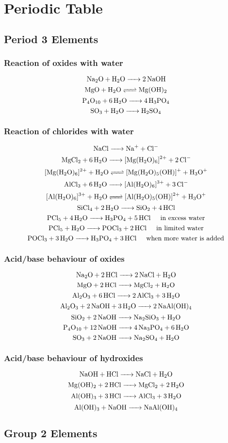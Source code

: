 \section{Periodic Table}
\subsection{Period 3 Elements}
\subsubsection{Reaction of oxides with water}
\[ \ce{Na2O + H2O -> 2 NaOH} \]
\[ \ce{MgO + H2O <=> Mg(OH)2} \]
\[ \ce{P4O10 + 6 H2O -> 4 H3PO4} \]
\[ \ce{SO3 + H2O -> H2SO4} \]

\subsubsection{Reaction of chlorides with water}
\[ \ce{NaCl -> Na^+ + Cl^-} \]
\[ \ce{MgCl2 + 6 H2O -> [Mg(H2O)6]^2+ + 2 Cl^-} \]
\[ \ce{[Mg(H2O)6]^2+ + H2O <=> [Mg(H2O)5(OH)]^+ + H3O^+} \]
\[ \ce{AlCl3 + 6 H2O -> [Al(H2O)6]^3+ + 3 Cl^-} \]
\[ \ce{[Al(H2O)6]^3+ + H2O <=> [Al(H2O)5(OH)]^2+ + H3O^+} \]
\[ \ce{SiCl4 + 2 H2O -> SiO2 + 4 HCl} \]
\[ \ce{PCl5 + 4 H2O -> H3PO4 + 5 HCl} \tab \text{in excess water} \]
\[ \ce{PCl5 + H2O -> POCl3 + 2 HCl} \tab \text{in limited water} \]
\[ \ce{POCl3 + 3 H2O -> H3PO4 + 3 HCl} \tab \text{when more water is added} \]

\subsubsection{Acid/base behaviour of oxides}
\[ \ce{Na2O + 2 HCl -> 2 NaCl + H2O} \]
\[ \ce{MgO + 2 HCl -> MgCl2 + H2O} \]
\[ \ce{Al2O3 + 6 HCl -> 2 AlCl3 + 3 H2O} \]
\[ \ce{Al2O3 + 2 NaOH + 3 H2O -> 2 NaAl(OH)4} \]
\[ \ce{SiO2 + 2 NaOH -> Na2SiO3 + H2O} \]
\[ \ce{P4O10 + 12 NaOH -> 4 Na3PO4 + 6 H2O} \]
\[ \ce{SO3 + 2 NaOH -> Na2SO4 + H2O} \]

\subsubsection{Acid/base behaviour of hydroxides}
\[ \ce{NaOH + HCl -> NaCl + H2O} \]
\[ \ce{Mg(OH)2 + 2 HCl -> MgCl2 + 2 H2O} \]
\[ \ce{Al(OH)3 + 3 HCl -> AlCl3 + 3 H2O} \]
\[ \ce{Al(OH)3 + NaOH -> NaAl(OH)4} \]
\pagebreak

\subsection{Group 2 Elements}

